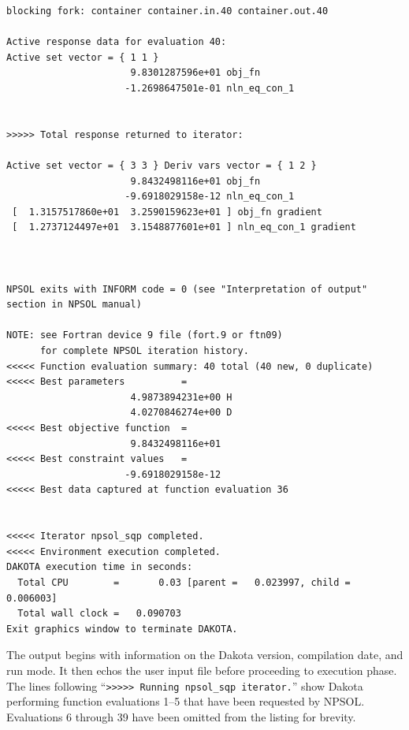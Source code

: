 \begin{small}
\begin{verbatim}
blocking fork: container container.in.40 container.out.40

Active response data for evaluation 40:
Active set vector = { 1 1 }
                      9.8301287596e+01 obj_fn
                     -1.2698647501e-01 nln_eq_con_1


>>>>> Total response returned to iterator:

Active set vector = { 3 3 } Deriv vars vector = { 1 2 }
                      9.8432498116e+01 obj_fn
                     -9.6918029158e-12 nln_eq_con_1
 [  1.3157517860e+01  3.2590159623e+01 ] obj_fn gradient
 [  1.2737124497e+01  3.1548877601e+01 ] nln_eq_con_1 gradient



NPSOL exits with INFORM code = 0 (see "Interpretation of output" section in NPSOL manual)

NOTE: see Fortran device 9 file (fort.9 or ftn09)
      for complete NPSOL iteration history.
<<<<< Function evaluation summary: 40 total (40 new, 0 duplicate)
<<<<< Best parameters          =
                      4.9873894231e+00 H
                      4.0270846274e+00 D
<<<<< Best objective function  =
                      9.8432498116e+01
<<<<< Best constraint values   =
                     -9.6918029158e-12
<<<<< Best data captured at function evaluation 36


<<<<< Iterator npsol_sqp completed.
<<<<< Environment execution completed.
DAKOTA execution time in seconds:
  Total CPU        =       0.03 [parent =   0.023997, child =   0.006003]
  Total wall clock =   0.090703
Exit graphics window to terminate DAKOTA.
\end{verbatim}
\end{small}

The output begins with information on the Dakota version, compilation
date, and run mode.  It then echos the user input file before
proceeding to execution phase.  The lines following ``\texttt{>>>>>
  Running npsol\_sqp iterator.}''  show Dakota performing function
evaluations 1--5 that have been requested by NPSOL. Evaluations 6
through 39 have been omitted from the listing for brevity.

